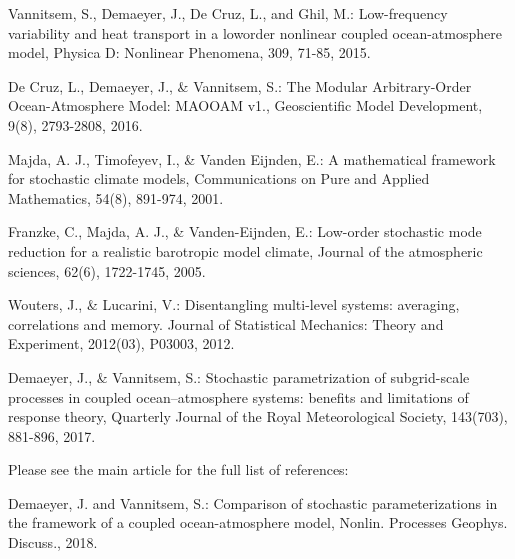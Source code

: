 \begin{DoxyItemize}
\item Vannitsem, S., Demaeyer, J., De Cruz, L., and Ghil, M.\+: Low-\/frequency variability and heat transport in a loworder nonlinear coupled ocean-\/atmosphere model, Physica D\+: Nonlinear Phenomena, 309, 71-\/85, 2015.
\item De Cruz, L., Demaeyer, J., \& Vannitsem, S.\+: The Modular Arbitrary-\/\+Order Ocean-\/\+Atmosphere Model\+: M\+A\+O\+O\+AM v1., Geoscientific Model Development, 9(8), 2793-\/2808, 2016.
\item Majda, A. J., Timofeyev, I., \& Vanden Eijnden, E.\+: A mathematical framework for stochastic climate models, Communications on Pure and Applied Mathematics, 54(8), 891-\/974, 2001.
\item Franzke, C., Majda, A. J., \& Vanden-\/\+Eijnden, E.\+: Low-\/order stochastic mode reduction for a realistic barotropic model climate, Journal of the atmospheric sciences, 62(6), 1722-\/1745, 2005.
\item Wouters, J., \& Lucarini, V.\+: Disentangling multi-\/level systems\+: averaging, correlations and memory. Journal of Statistical Mechanics\+: Theory and Experiment, 2012(03), P03003, 2012.
\item Demaeyer, J., \& Vannitsem, S.\+: Stochastic parametrization of subgrid-\/scale processes in coupled ocean–atmosphere systems\+: benefits and limitations of response theory, Quarterly Journal of the Royal Meteorological Society, 143(703), 881-\/896, 2017.
\end{DoxyItemize}

Please see the main article for the full list of references\+:


\begin{DoxyItemize}
\item Demaeyer, J. and Vannitsem, S.\+: Comparison of stochastic parameterizations in the framework of a coupled ocean-\/atmosphere model, Nonlin. Processes Geophys. Discuss., 2018. 
\end{DoxyItemize}